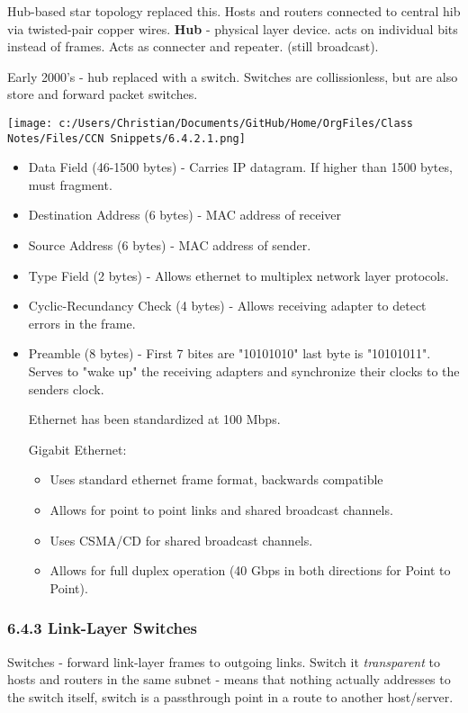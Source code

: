 \documentclass[11pt]{article}
\begin{document}
Hub-based star topology replaced this. Hosts and routers connected to central hib via twisted-pair copper wires. \textbf{Hub} - physical layer device. acts on individual bits instead of frames. Acts as connecter and repeater. (still broadcast).

Early 2000's - hub replaced with a switch. Switches are collissionless, but are also store and forward packet switches.

\begin{figure*}
\centering
\texttt{[image: c:/Users/Christian/Documents/GitHub/Home/OrgFiles/Class Notes/Files/CCN Snippets/6.4.2.1.png]}
\end{figure*}

\begin{itemize}
\item Data Field (46-1500 bytes) -  Carries IP datagram. If higher than 1500 bytes, must fragment.
\item Destination Address (6 bytes) - MAC address of receiver
\item Source Address (6 bytes) - MAC address of sender.
\item Type Field (2 bytes) - Allows ethernet to multiplex network layer protocols.
\item Cyclic-Recundancy Check (4 bytes) - Allows receiving adapter to detect errors in the frame.
\item Preamble (8 bytes) - First 7 bites are "10101010" last byte is "10101011". Serves to "wake up" the receiving adapters and synchronize their clocks to the senders clock.

Ethernet has been standardized at 100 Mbps.

Gigabit Ethernet:
\begin{itemize}
\item Uses standard ethernet frame format, backwards compatible

\item Allows for point to point links and shared broadcast channels.

\item Uses CSMA/CD for shared broadcast channels.

\item Allows for full duplex operation (40 Gbps in both directions for Point to Point).
\end{itemize}
\end{itemize}

\subsubsection{6.4.3 Link-Layer Switches}
\label{sec:org7b4e819}
Switches - forward link-layer frames to outgoing links.
Switch it \emph{transparent} to hosts and routers in the same subnet - means that nothing actually addresses to the switch itself, switch is a passthrough point in a route to another host/server.
\end{document}
